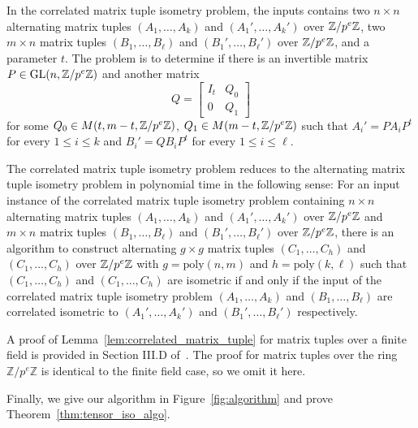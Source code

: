 \begin{definition}
In the correlated matrix tuple isometry problem, the inputs contains 
two $n \times n$ alternating matrix tuples $(A_1, \dots, A_k)$ and $(A_1', \dots, A_k')$ over $ \mathbb{Z} / p^e \mathbb{Z}$,
two $m \times n$ matrix tuples $(B_1, \dots, B_\ell)$ and $(B_1', \dots, B_\ell')$ over $\mathbb{Z} / p^e \mathbb{Z}$,
and a parameter $t$. 
The problem is to determine if there is an invertible matrix $P \in \mathrm{GL}(n, \mathbb{Z} / p^e \mathbb{Z})$
and another matrix 
\[Q = \begin{bmatrix} I_{t} & Q_0 \\ 0 & Q_1\end{bmatrix}\] for some $Q_0 \in M(t, m - t, \mathbb{Z} / p^e \mathbb{Z})$, $Q_1 \in M(m - t, \mathbb{Z} / p^e \mathbb{Z})$ such that 
$A_i' = P A_i P^t$ for every $1 \leq i \leq k$ and $B_i' = Q B_i P^t$ for every $1 \leq i \leq \ell$.
\end{definition}
\begin{lemma}\label{lem:correlated_matrix_tuple}
The correlated matrix tuple isometry problem reduces to the alternating matrix tuple isometry problem in polynomial time in the following sense: 
For an input instance of the correlated matrix tuple isometry problem containing 
$n \times n$ alternating matrix tuples $(A_1, \dots, A_k)$ and $(A_1', \dots, A_k')$ over $ \mathbb{Z} / p^e \mathbb{Z}$ and 
$m \times n$ matrix tuples $(B_1, \dots, B_\ell)$ and $(B_1', \dots, B_\ell')$ over $\mathbb{Z} / p^e \mathbb{Z}$,
there is an algorithm to construct alternating $g \times g$ matrix tuples 
$(C_1, \dots, C_h)$ and $(C_1, \dots, C_h)$ over $\mathbb{Z} / p^e \mathbb{Z}$ with $g = \mathrm{poly}(n, m)$ and $h =  \mathrm{poly}(k, \ell)$
such that $(C_1, \dots, C_h)$ and $(C_1, \dots, C_h)$ are isometric if and only if 
the input of the correlated matrix tuple isometry  problem 
$(A_1, \dots, A_k)$  and $(B_1, \dots, B_\ell)$ are correlated isometric to $(A_1', \dots, A_k')$ and $(B_1', \dots, B_\ell')$ respectively. 
\end{lemma}

A proof of Lemma~\ref{lem:correlated_matrix_tuple}  for matrix tuples over a finite field is provided in Section III.D of~\cite{IMQSZ24}. The proof for matrix tuples over the ring 
$\mathbb{Z}/p^e\mathbb{Z}$ is identical to the finite field case, so we omit it here.


Finally, we give our algorithm in Figure~\ref{fig:algorithm} and prove Theorem~\ref{thm:tensor_iso_algo}. 

